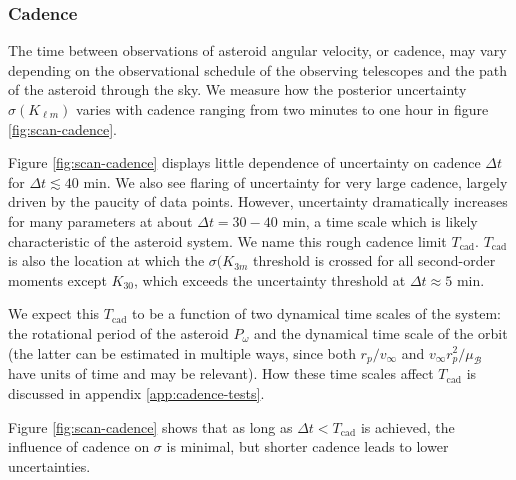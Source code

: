 \documentclass[fleqn,usenatbib]{mnras}
\newcommand{\brackets}[1]{\left[ #1 \right]}
\begin{document}
\subsubsection{Cadence}
\label{sec:scan-cadence}

The time between observations of asteroid angular velocity, or cadence, may vary depending on the observational schedule of the observing telescopes and the path of the asteroid through the sky.  We measure how the posterior uncertainty $\sigma(K_{\ell m})$ varies with cadence ranging from two minutes to one hour in figure \ref{fig:scan-cadence}.

Figure \ref{fig:scan-cadence} displays little dependence of uncertainty on cadence $\Delta t$ for $\Delta t \lesssim 40$ min. We also see flaring of uncertainty for very large cadence, largely driven by the paucity of data points. However, uncertainty dramatically increases for many parameters at about $\Delta t = 30-40$ min, a time scale which is likely characteristic of the asteroid system.  We name this rough cadence limit $T_\text{cad}$. $T_\text{cad}$ is also the location at which the $\sigma(K_{3m}$ threshold is crossed for all second-order moments except $K_{30}$, which exceeds the uncertainty threshold at $\Delta t \approx 5$ min.

We expect this $T_\text{cad}$ to be a function of two dynamical time scales of the system: the rotational period of the asteroid $P_\omega$ and the dynamical time scale of the orbit (the latter can be estimated in multiple ways, since both $r_p / v_\infty$ and $v_\infty r_p^2 / \mu_\mathcal{B}$ have units of time and may be relevant). How these time scales affect $T_\text{cad}$ is discussed in appendix \ref{app:cadence-tests}.

Figure \ref{fig:scan-cadence} shows that as long as $\Delta t < T_\text{cad}$ is achieved, the influence of cadence on $\sigma$ is minimal, but shorter cadence leads to lower uncertainties.
\end{document}
